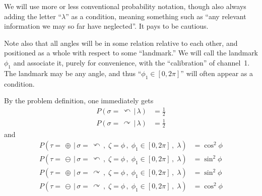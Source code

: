 \documentclass[9pt,technote]{IEEEtran}
\begin{document}
We will use more or less conventional probability notation, though
also always adding the letter ``$\lambda$'' as a condition, meaning
something such as ``any relevant information we may so far have
neglected''. It pays to be cautious.

Note also that all angles will be in some relation relative to each
other, and positioned as a whole with respect to some ``landmark.'' We
will call the landmark $\phi_1$ and associate it, purely for
convenience, with the ``calibration'' of channel~1. The landmark may
be any angle, and thus ``$\phi_1\in[0,2\pi]$'' will often appear as a
condition.

By the problem definition, one immediately gets
\begin{align}
  P(\sigma=\,\curvearrowleft \,|\, \lambda) &= \frac{1}{2} \\
  P(\sigma=\,\curvearrowright \,|\, \lambda) &= \frac{1}{2}
\end{align}
and
\begin{align}
  P(\tau=\,\oplus \,|\, \sigma=\,\curvearrowleft\,,\; \zeta=\phi\,,\; \phi_1\in[0,2\pi]\,,\; \lambda) &= \cos^2 \phi \\
  P(\tau=\,\ominus \,|\, \sigma=\,\curvearrowleft\,,\; \zeta=\phi\,,\; \phi_1\in[0,2\pi]\,,\; \lambda) &= \sin^2 \phi \\
  P(\tau=\,\oplus \,|\, \sigma=\,\curvearrowright\,,\; \zeta=\phi\,,\; \phi_1\in[0,2\pi]\,,\; \lambda) &= \sin^2 \phi \\
  P(\tau=\,\ominus \,|\, \sigma=\,\curvearrowright\,,\; \zeta=\phi\,,\; \phi_1\in[0,2\pi]\,,\; \lambda) &= \cos^2 \phi
\end{align}
\end{document}
